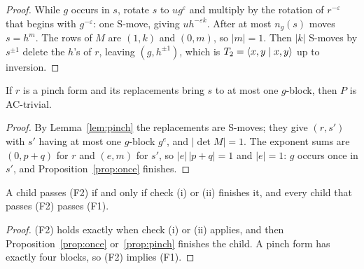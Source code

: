 \begin{proof}
While $g$ occurs in $s$, rotate $s$ to $ug^{\varepsilon}$ and multiply by the rotation of $r^{-\varepsilon}$ that begins
with $g^{-\varepsilon}$: one S-move, giving $uh^{-\varepsilon k}$. After at most $n_g(s)$ moves $s=h^m$. The rows of
$M$ are $(1,k)$ and $(0,m)$, so $|m|=1$. Then $|k|$ S-moves by $s^{\pm1}$ delete the $h$'s of $r$, leaving
$(g,h^{\pm1})$, which is $T_2=\langle x,y \mid x,y \rangle$ up to inversion.
\end{proof}

\begin{proposition}\label{prop:pinch}
If $r$ is a pinch form and its replacements bring $s$ to at most one $g$-block, then $P$ is AC-trivial.
\end{proposition}

\begin{proof}
By Lemma~\ref{lem:pinch} the replacements are S-moves; they give $(r,s')$ with $s'$ having at most one $g$-block
$g^e$, and $|\det M|=1$. The exponent sums are $(0,p+q)$ for $r$ and $(e,m)$ for $s'$, so $|e|\,|p+q|=1$ and $|e|=1$:
$g$ occurs once in $s'$, and Proposition~\ref{prop:once} finishes.
\end{proof}

\begin{proposition}\label{prop:filters}
A child passes (F2) if and only if check (i) or (ii) finishes it, and every child that passes (F2) passes (F1).
\end{proposition}

\begin{proof}
(F2) holds exactly when check (i) or (ii) applies, and then Proposition~\ref{prop:once} or~\ref{prop:pinch} finishes
the child. A pinch form has exactly four blocks, so (F2) implies (F1).
\end{proof}
